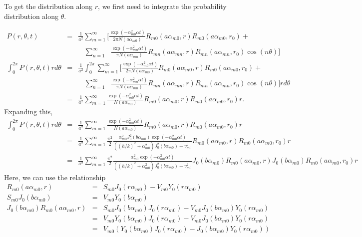 \documentclass{article}
\begin{document}
To get the distribution along $r$, we first need to integrate the probability
distribution along $\theta$.

\begin{eqnarray}
    P(r, \theta, t) &=&
    \frac{1}{a^2} \sum_{m=1}^{\infty} \Bigg[
    \frac{\exp(-\alpha_{m0}^2\alpha t)}{2\pi N(a\alpha_{m0})}
    R_{m0}(a\alpha_{m0}, r) R_{m0}(a\alpha_{m0}, r_0) +
\nonumber\\
    & &\ \ \ \ \sum_{n=1}^{\infty}\ \ \ 
    \frac{\exp(-\alpha_{mn}^2\alpha t)}{\pi N(a\alpha_{mn})}
    R_{mn}(a\alpha_{mn}, r) R_{mn}(a\alpha_{mn}, r_0)\cos(n\theta)\Bigg]
\nonumber\\
    \int_0^{2\pi} P(r, \theta, t) rd\theta
    &=& \frac{1}{a^2} \int_0^{2\pi} \sum_{m=1}^{\infty} \Bigg[
    \frac{\exp(-\alpha_{m0}^2\alpha t)}{2\pi N(a\alpha_{m0})}
    R_{m0}(a\alpha_{m0}, r) R_{m0}(a\alpha_{m0}, r_0) +
\nonumber\\
    & &\ \ \ \ \sum_{n=1}^{\infty}\ \ \ 
    \frac{\exp(-\alpha_{mn}^2\alpha t)}{\pi N(a\alpha_{mn})}
    R_{mn}(a\alpha_{mn}, r) R_{mn}(a\alpha_{mn}, r_0)\cos(n\theta)\Bigg] rd\theta
\nonumber\\
    &=& \frac{1}{a^2} \sum_{m=1}^{\infty}
    \frac{\exp(-\alpha_{m0}^2\alpha t)}{N(a\alpha_{m0})}
    R_{m0}(a\alpha_{m0}, r) R_{m0}(a\alpha_{m0}, r_0) r.
\end{eqnarray}
%
Expanding this,
%
\begin{eqnarray}
    \int_0^{2\pi} P(r, \theta, t) rd\theta
    &=& \frac{1}{a^2} \sum_{m=1}^{\infty}
    \frac{\exp(-\alpha_{m0}^2\alpha t)}{N(a\alpha_{m0})}
    R_{m0}(a\alpha_{m0}, r) R_{m0}(a\alpha_{m0}, r_0) r
\nonumber \\
    &=& \frac{1}{a^2} \sum_{m=1}^{\infty}
    \frac{\pi^2}{2}
    \frac{\alpha_{m0}^2J_0^2(b\alpha_{m0})\exp(-\alpha_{m0}^2\alpha t)}
         {((h/k)^2 + \alpha_{m0}^2)J_0^2(b\alpha_{m0}) - v_{m0}^2}
    R_{m0}(a\alpha_{m0}, r) R_{m0}(a\alpha_{m0}, r_0) r
\nonumber \\
    &=& \frac{1}{a^2} \sum_{m=1}^{\infty}
    \frac{\pi^2}{2}
    \frac{\alpha_{m0}^2\exp(-\alpha_{m0}^2\alpha t)}
         {((h/k)^2 + \alpha_{m0}^2)J_0^2(b\alpha_{m0}) - v_{m0}^2}
    J_0(b\alpha_{m0})R_{m0}(a\alpha_{m0}, r) J_0(b\alpha_{m0})R_{m0}(a\alpha_{m0}, r_0) r
\end{eqnarray}
%
Here, we can use the relationship
%
\begin{eqnarray}
    R_{m0}(a\alpha_{m0}, r) &=& S_{m0}J_0(r\alpha_{m0}) - V_{m0}Y_0(r\alpha_{m0})
\nonumber\\
    S_{m0}J_0(b\alpha_{m0}) &=& V_{m0}Y_0(b\alpha_{m0})
\nonumber\\
    J_0(b\alpha_{m0})R_{m0}(a\alpha_{m0}, r)
    &=& S_{m0}J_0(b\alpha_{m0})J_0(r\alpha_{m0}) - V_{m0}J_0(b\alpha_{m0})Y_0(r\alpha_{m0})
\nonumber\\
    &=& V_{m0}Y_0(b\alpha_{m0})J_0(r\alpha_{m0}) - V_{m0}J_0(b\alpha_{m0})Y_0(r\alpha_{m0})
\nonumber\\
    &=& V_{m0}\left(Y_0(b\alpha_{m0})J_0(r\alpha_{m0}) - J_0(b\alpha_{m0})Y_0(r\alpha_{m0})\right)
\end{eqnarray}
\end{document}
